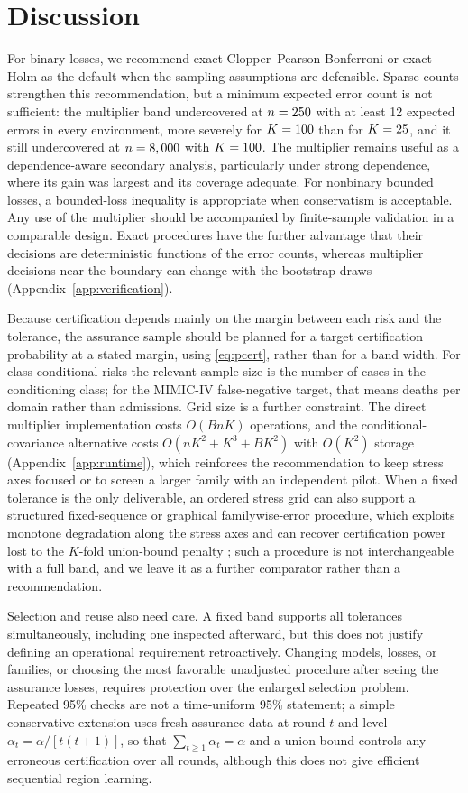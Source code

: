 \documentclass[twoside,11pt]{article}
\begin{document}
\section{Discussion}
\label{sec:discussion}
For binary losses, we recommend exact Clopper--Pearson Bonferroni or exact Holm as the default
when the sampling assumptions are defensible. Sparse counts strengthen this recommendation, but
a minimum expected error count is not sufficient: the multiplier band undercovered at
$n=250$ with at least 12 expected errors in every environment, more severely for
$K=100$ than for $K=25$, and it still undercovered at $n=8,000$ with
$K=100$. The multiplier remains useful as a dependence-aware secondary analysis,
particularly under strong dependence, where its gain was largest and its coverage adequate.
For nonbinary bounded losses, a bounded-loss inequality is appropriate when conservatism is
acceptable. Any use of the multiplier should be accompanied by finite-sample validation in a
comparable design. Exact procedures have the further advantage that their decisions are
deterministic functions of the error counts, whereas multiplier decisions near the boundary
can change with the bootstrap draws (Appendix~\ref{app:verification}).

Because certification depends mainly on the margin between each risk and the tolerance, the
assurance sample should be planned for a target certification probability at a stated margin,
using \eqref{eq:pcert}, rather than for a band width. For class-conditional risks the relevant
sample size is the number of cases in the conditioning class; for the MIMIC-IV false-negative
target, that means deaths per domain rather than admissions. Grid size is a further
constraint. The direct multiplier implementation costs $O(BnK)$ operations, and the
conditional-covariance alternative costs $O(nK^2+K^3+BK^2)$ with $O(K^2)$ storage
(Appendix~\ref{app:runtime}), which reinforces the recommendation to keep stress axes focused
or to screen a larger family with an independent pilot. When a fixed tolerance is the only
deliverable, an ordered stress grid can also support a structured fixed-sequence or graphical
familywise-error procedure, which exploits monotone degradation along the stress axes and can
recover certification power lost to the $K$-fold union-bound penalty
\citep{angelopoulos2025ltt}; such a procedure is not interchangeable with a full band, and we
leave it as a further comparator rather than a recommendation.

Selection and reuse also need care. A fixed band supports all tolerances simultaneously,
including one inspected afterward, but this does not justify defining an operational
requirement retroactively. Changing models, losses, or families, or choosing the most
favorable unadjusted procedure after seeing the assurance losses, requires protection over the
enlarged selection problem. Repeated 95\% checks are not a time-uniform 95\% statement; a
simple conservative extension uses fresh assurance data at round $t$ and level
$\alpha_t=\alpha/[t(t+1)]$, so that $\sum_{t\geq1}\alpha_t=\alpha$ and a union bound controls any
erroneous certification over all rounds, although this does not give efficient sequential
region learning.
\end{document}

